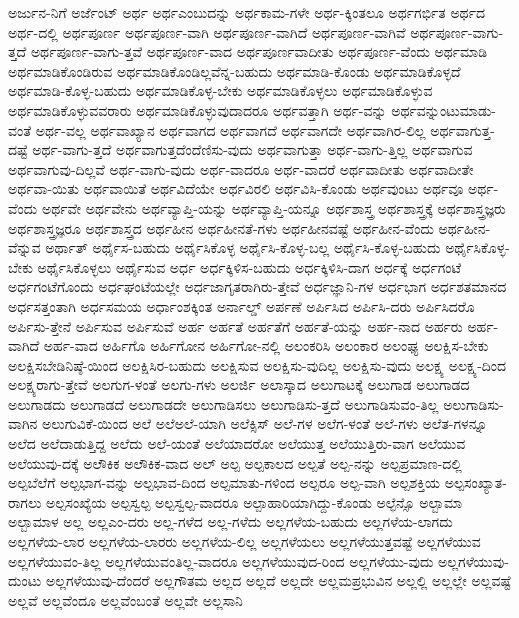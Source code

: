 {ಅರ್ಜುನ-ನಿಗೆ
ಅರ್ಜೆಂಟ್
ಅರ್ಥ
ಅರ್ಥಎಂಬುದನ್ನು
ಅರ್ಥಕಾಮ-ಗಳೇ
ಅರ್ಥ-ಕ್ಕಿಂತಲೂ
ಅರ್ಥಗರ್ಭಿತ
ಅರ್ಥದ
ಅರ್ಥ-ದಲ್ಲಿ
ಅರ್ಥಪೂರ್ಣ
ಅರ್ಥಪೂರ್ಣ-ವಾಗಿ
ಅರ್ಥಪೂರ್ಣ-ವಾಗಿದೆ
ಅರ್ಥಪೂರ್ಣ-ವಾಗಿವೆ
ಅರ್ಥಪೂರ್ಣ-ವಾಗು-ತ್ತದೆ
ಅರ್ಥಪೂರ್ಣ-ವಾಗು-ತ್ತವೆ
ಅರ್ಥಪೂರ್ಣ-ವಾದ
ಅರ್ಥಪೂರ್ಣವಾದೀತು
ಅರ್ಥಪೂರ್ಣ-ವೆಂದು
ಅರ್ಥಮಾಡಿ
ಅರ್ಥಮಾಡಿಕೊಂಡಿರುವ
ಅರ್ಥಮಾಡಿಕೊಂಡಿಲ್ಲವೆನ್ನ-ಬಹುದು
ಅರ್ಥಮಾಡಿ-ಕೊಂಡು
ಅರ್ಥಮಾಡಿಕೊಳ್ಳದೆ
ಅರ್ಥಮಾಡಿ-ಕೊಳ್ಳ-ಬಹುದು
ಅರ್ಥಮಾಡಿಕೊಳ್ಳ-ಬೇಕು
ಅರ್ಥಮಾಡಿಕೊಳ್ಳಲು
ಅರ್ಥಮಾಡಿಕೊಳ್ಳುವ
ಅರ್ಥಮಾಡಿಕೊಳ್ಳುವವರಾರು
ಅರ್ಥಮಾಡಿಕೊಳ್ಳುವುದಾದರೂ
ಅರ್ಥವತ್ತಾಗಿ
ಅರ್ಥ-ವನ್ನು
ಅರ್ಥವನ್ನುಂಟುಮಾಡು-ವಂತೆ
ಅರ್ಥ-ವಲ್ಲ
ಅರ್ಥವಾಖ್ಯಾನ
ಅರ್ಥವಾಗದ
ಅರ್ಥವಾಗದೆ
ಅರ್ಥವಾಗದೇ
ಅರ್ಥವಾಗಿರ-ಲಿಲ್ಲ
ಅರ್ಥವಾಗುತ್ತ-ದಷ್ಟೆ
ಅರ್ಥ-ವಾಗು-ತ್ತದೆ
ಅರ್ಥವಾಗುತ್ತದೆಂದೆಣಿಸು-ವುದು
ಅರ್ಥವಾಗುತ್ತಾ
ಅರ್ಥ-ವಾಗು-ತ್ತಿಲ್ಲ
ಅರ್ಥವಾಗುವ
ಅರ್ಥವಾಗುವು-ದಿಲ್ಲವೆ
ಅರ್ಥ-ವಾಗು-ವುದು
ಅರ್ಥ-ವಾದರೂ
ಅರ್ಥ-ವಾದರೆ
ಅರ್ಥವಾದೀತು
ಅರ್ಥವಾದೀತೇ
ಅರ್ಥವಾ-ಯಿತು
ಅರ್ಥವಾಯಿತೆ
ಅರ್ಥವಿದೆಯೇ
ಅರ್ಥವಿರಲಿ
ಅರ್ಥವಿಸಿ-ಕೊಂಡು
ಅರ್ಥವುಂಟು
ಅರ್ಥವೂ
ಅರ್ಥ-ವೆಂದು
ಅರ್ಥವೇ
ಅರ್ಥವೇನು
ಅರ್ಥವ್ಯಾಪ್ತಿ-ಯನ್ನು
ಅರ್ಥವ್ಯಾಪ್ತಿ-ಯನ್ನೂ
ಅರ್ಥಶಾಸ್ತ್ರ
ಅರ್ಥಶಾಸ್ತ್ರಕ್ಕೆ
ಅರ್ಥಶಾಸ್ತ್ರಜ್ಞರು
ಅರ್ಥಶಾಸ್ತ್ರಜ್ಞರೂ
ಅರ್ಥಶಾಸ್ತ್ರದ
ಅರ್ಥಹೀನ
ಅರ್ಥಹೀನತೆ-ಗಳು
ಅರ್ಥಹೀನವಷ್ಟೆ
ಅರ್ಥಹೀನ-ವೆಂದು
ಅರ್ಥಹೀನ-ವೆನ್ನುವ
ಅರ್ಥಾತ್
ಅರ್ಥೈಸ-ಬಹುದು
ಅರ್ಥೈಸಿಕೊಳ್ಳ
ಅರ್ಥೈಸಿ-ಕೊಳ್ಳ-ಬಲ್ಲ
ಅರ್ಥೈಸಿ-ಕೊಳ್ಳ-ಬಹುದು
ಅರ್ಥೈಸಿಕೊಳ್ಳ-ಬೇಕು
ಅರ್ಥೈಸಿಕೊಳ್ಳಲು
ಅರ್ಥೈಸುವ
ಅರ್ಧ
ಅರ್ಧಕ್ಕಿಳಿಸ-ಬಹುದು
ಅರ್ಧಕ್ಕಿಳಿಸಿ-ದಾಗ
ಅರ್ಧಕ್ಕೆ
ಅರ್ಧಗಂಟೆ
ಅರ್ಧಗಂಟೆಗೊಂದು
ಅರ್ಧಘಂಟೆಯಲ್ಲೇ
ಅರ್ಧಜಾಗೃತರಾಗಿರು-ತ್ತೇವೆ
ಅರ್ಧಜ್ಞಾನಿ-ಗಳ
ಅರ್ಧಭಾಗ
ಅರ್ಧಶತಮಾನದ
ಅರ್ಧಸತ್ತಂತಾಗಿ
ಅರ್ಧಸಮಯ
ಅರ್ಧಾಂಶಕ್ಕಿಂತ
ಅರ್ನಾಲ್ಡ್
ಅರ್ಪಣೆ
ಅರ್ಪಿಸಿದ
ಅರ್ಪಿಸಿ-ದರು
ಅರ್ಪಿಸಿದರೊ
ಅರ್ಪಿಸು-ತ್ತೇನೆ
ಅರ್ಪಿಸುವ
ಅರ್ಪಿಸುವೆ
ಅರ್ಹ
ಅರ್ಹತೆ
ಅರ್ಹತೆಗೆ
ಅರ್ಹತೆ-ಯನ್ನು
ಅರ್ಹ-ನಾದ
ಅರ್ಹರು
ಅರ್ಹ-ವಾಗಿದೆ
ಅರ್ಹ-ವಾದ
ಅರ್ಹಿಗೊ
ಅರ್ಹಿಗೋನ
ಅರ್ಹಿಗೋ-ನಲ್ಲಿ
ಅಲಂಕರಿಸಿ
ಅಲಂಕಾರ
ಅಲಂಘ್ಯ
ಅಲಕ್ಷಿಸ-ಬೇಕು
ಅಲಕ್ಷಿಸಬೇಡಿನಿಷ್ಠೆ-ಯಿಂದ
ಅಲಕ್ಷಿಸಿರ-ಬಹುದು
ಅಲಕ್ಷಿಸುವ
ಅಲಕ್ಷಿಸು-ವುದಿಲ್ಲ
ಅಲಕ್ಷಿಸು-ವುದು
ಅಲಕ್ಷ್ಯ
ಅಲಕ್ಷ್ಯ-ದಿಂದ
ಅಲಕ್ಷ್ಯರಾಗು-ತ್ತೇವೆ
ಅಲಗುಗ-ಳಂತೆ
ಅಲಗು-ಗಳು
ಅಲರ್ಜಿ
ಅಲಾಸ್ಕಾದ
ಅಲುಗಾಟಕ್ಕೆ
ಅಲುಗಾಡ
ಅಲುಗಾಡದ
ಅಲುಗಾಡದು
ಅಲುಗಾಡದೆ
ಅಲುಗಾಡದೇ
ಅಲುಗಾಡಿಸಲು
ಅಲುಗಾಡಿಸು-ತ್ತದೆ
ಅಲುಗಾಡಿಸುವಂ-ತಿಲ್ಲ
ಅಲುಗಾಡಿಸು-ವಾಗಿನ
ಅಲುಗುವಿಕೆ-ಯಿಂದ
ಅಲೆ
ಅಲೆಅಲೆ-ಯಾಗಿ
ಅಲೆಕ್ಸಿಸ್
ಅಲೆ-ಗಳ
ಅಲೆಗ-ಳಂತೆ
ಅಲೆ-ಗಳು
ಅಲೆತ-ಗಳನ್ನೂ
ಅಲೆದ
ಅಲೆದಾಡುತ್ತಿದ್ದ
ಅಲೆದು
ಅಲೆ-ಯಂತೆ
ಅಲೆಯಾದರೋ
ಅಲೆಯುತ್ತ
ಅಲೆಯುತ್ತಿರು-ವಾಗ
ಅಲೆಯುವ
ಅಲೆಯುವು-ದಕ್ಕೆ
ಅಲೌಕಿಕ
ಅಲೌಕಿಕ-ವಾದ
ಅಲ್
ಅಲ್ಪ
ಅಲ್ಪಕಾಲದ
ಅಲ್ಪತೆ
ಅಲ್ಪ-ನನ್ನು
ಅಲ್ಪಪ್ರಮಾಣ-ದಲ್ಲಿ
ಅಲ್ಪಬೆಲೆಗೆ
ಅಲ್ಪಭಾಗ-ವನ್ನು
ಅಲ್ಪಭಾವ-ದಿಂದ
ಅಲ್ಪಮಾತು-ಗಳಿಂದ
ಅಲ್ಪರೂ
ಅಲ್ಪ-ವಾಗಿ
ಅಲ್ಪಶಕ್ತಿಯ
ಅಲ್ಪಸಂಖ್ಯಾತ-ರಾಗಲು
ಅಲ್ಪಸಂಖ್ಯೆಯ
ಅಲ್ಪಸ್ವಲ್ಪ
ಅಲ್ಪಸ್ವಲ್ಪ-ವಾದರೂ
ಅಲ್ಪಾಹಾರಿಯಾಗಿದ್ದು-ಕೊಂಡು
ಅಲ್ಫೆನ್ಸೊ
ಅಲ್ಬಾಮಾ
ಅಲ್ಬಾಮಾಳ
ಅಲ್ಲ
ಅಲ್ಲಎಂ-ದರು
ಅಲ್ಲ-ಗಳೆದ
ಅಲ್ಲ-ಗಳೆದು
ಅಲ್ಲಗಳೆಯ-ಬಹುದು
ಅಲ್ಲಗಳೆಯ-ಲಾಗದು
ಅಲ್ಲಗಳೆಯ-ಲಾರ
ಅಲ್ಲಗಳೆಯ-ಲಾರರು
ಅಲ್ಲಗಳೆಯ-ಲಿಲ್ಲ
ಅಲ್ಲಗಳೆಯಲು
ಅಲ್ಲಗಳೆಯುತ್ತವಷ್ಟೆ
ಅಲ್ಲಗಳೆಯುವ
ಅಲ್ಲಗಳೆಯುವಂ-ತಿಲ್ಲ
ಅಲ್ಲಗಳೆಯುವಂತಿಲ್ಲ-ವಾದರೂ
ಅಲ್ಲಗಳೆಯುವುದ-ರಿಂದ
ಅಲ್ಲಗಳೆಯು-ವುದು
ಅಲ್ಲಗಳೆಯುವು-ದುಂಟು
ಅಲ್ಲಗಳೆಯುವು-ದೆಂದರೆ
ಅಲ್ಲಗೌತಮ
ಅಲ್ಲದ
ಅಲ್ಲದೆ
ಅಲ್ಲದೇ
ಅಲ್ಲಮಪ್ರಭುವಿನ
ಅಲ್ಲಲ್ಲಿ
ಅಲ್ಲಲ್ಲೇ
ಅಲ್ಲವಷ್ಟೆ
ಅಲ್ಲವೆ
ಅಲ್ಲವೆಂದೂ
ಅಲ್ಲವೆಂಬಂತೆ
ಅಲ್ಲವೇ
ಅಲ್ಲಸಾನಿ
}
